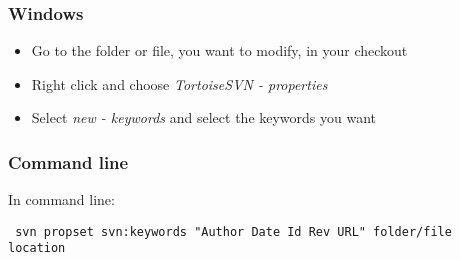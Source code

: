 \subsubsection{Windows}
\begin{itemize}
\item Go to the folder or file, you want to modify, in your checkout
\item Right click and choose \emph{TortoiseSVN - properties}
\item Select \emph{new - keywords} and select the keywords you want
\end{itemize}
\subsubsection{Command line}
In command line:
\begin{verbatim} svn propset svn:keywords "Author Date Id Rev URL" folder/file location \end{verbatim}
